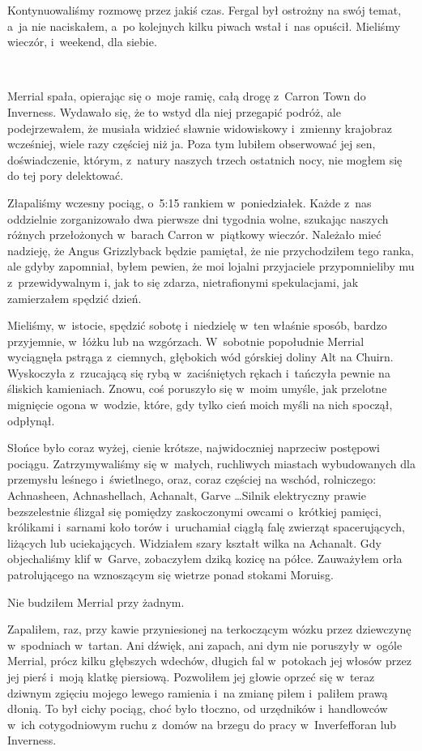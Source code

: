 \documentclass[oneside,polish,11pt,sfheadings]{mwbk}
\begin{document}
Kontynuowaliśmy rozmowę przez jakiś czas. Fergal był ostrożny na swój
temat, a~ja nie naciskałem, a~po kolejnych kilku piwach wstał i~nas
opuścił. Mieliśmy wieczór, i~weekend, dla siebie.

~

Merrial spała, opierając się o~moje ramię, całą drogę z~Carron Town do
Inverness. Wydawało się, że to wstyd dla niej przegapić podróż, ale
podejrzewałem, że musiała widzieć sławnie widowiskowy i~zmienny
krajobraz wcześniej, wiele razy częściej niż ja. Poza tym lubiłem
obserwować jej sen, doświadczenie, którym, z~natury naszych trzech
ostatnich nocy, nie mogłem się do tej pory delektować.

Złapaliśmy wczesny pociąg, o~5:15 rankiem w~poniedziałek. Każde z~nas
oddzielnie zorganizowało dwa pierwsze dni tygodnia wolne, szukając
naszych różnych przełożonych w~barach Carron w~piątkowy wieczór.
Należało mieć nadzieję, że Angus Grizzlyback będzie pamiętał, że nie
przychodziłem tego ranka, ale gdyby zapomniał, byłem pewien, że moi
lojalni przyjaciele przypomnieliby mu z~przewidywalnym i, jak to się
zdarza, nietrafionymi spekulacjami, jak zamierzałem spędzić dzień.

Mieliśmy, w~istocie, spędzić sobotę i~niedzielę w~ten właśnie sposób,
bardzo przyjemnie, w~łóżku lub na wzgórzach. W~sobotnie popołudnie
Merrial wyciągnęła pstrąga z~ciemnych, głębokich wód górskiej doliny Alt
na Chuirn. Wyskoczyła z~rzucającą się rybą w~zaciśniętych rękach i~tańczyła pewnie na śliskich kamieniach. Znowu, coś poruszyło się w~moim
umyśle, jak przelotne mignięcie ogona w~wodzie, które, gdy tylko cień
moich myśli na nich spoczął, odpłynął.

Słońce było coraz wyżej, cienie krótsze, najwidoczniej naprzeciw
postępowi pociągu. Zatrzymywaliśmy się w~małych, ruchliwych miastach
wybudowanych dla przemysłu leśnego i~świetlnego, oraz, coraz częściej na
wschód, rolniczego: Achnasheen, Achnashellach, Achanalt, Garve \ldots Silnik
elektryczny prawie bezszelestnie ślizgał się pomiędzy zaskoczonymi
owcami o~krótkiej pamięci, królikami i~sarnami koło torów i~uruchamiał
ciągłą falę zwierząt spacerujących, liżących lub uciekających. Widziałem
szary kształt wilka na Achanalt. Gdy objechaliśmy klif w~Garve,
zobaczyłem dziką kozicę na półce. Zauważyłem orła patrolującego na
wznoszącym się wietrze ponad stokami Moruisg.

Nie budziłem Merrial przy żadnym.

Zapaliłem, raz, przy kawie przyniesionej na terkoczącym wózku przez
dziewczynę w~spodniach w~tartan. Ani dźwięk, ani zapach, ani dym nie
poruszyły w~ogóle Merrial, prócz kilku głębszych wdechów, długich fal w~potokach jej włosów przez jej pierś i~moją klatkę piersiową. Pozwoliłem
jej głowie oprzeć się w~teraz dziwnym zgięciu mojego lewego ramienia i~na zmianę piłem i~paliłem prawą dłonią. To był cichy pociąg, choć było
tłoczno, od urzędników i~handlowców w~ich cotygodniowym ruchu z~domów na
brzegu do pracy w~Inverfefforan lub Inverness.
\end{document}
